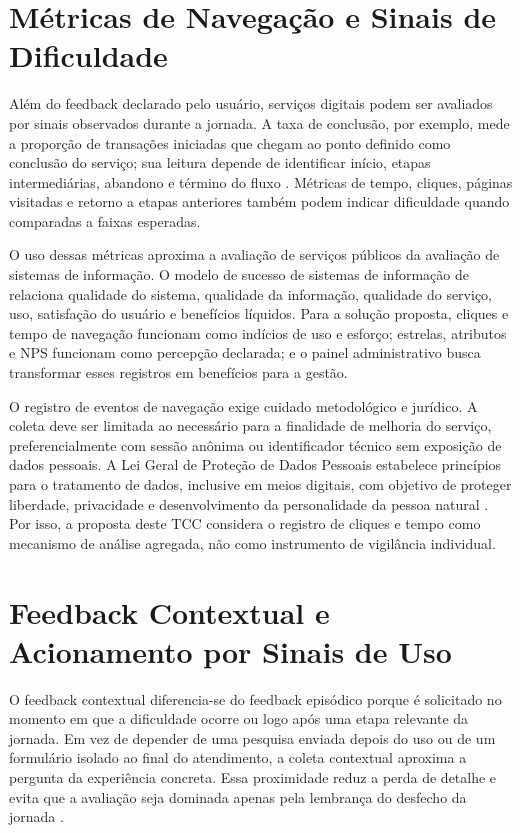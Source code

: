 \section{Métricas de Navegação e Sinais de Dificuldade}

Além do feedback declarado pelo usuário, serviços digitais podem ser avaliados
por sinais observados durante a jornada. A taxa de conclusão, por exemplo, mede a
proporção de transações iniciadas que chegam ao ponto definido como conclusão do
serviço; sua leitura depende de identificar início, etapas intermediárias,
abandono e término do fluxo \cite{govuk2021completionRate}. Métricas de tempo,
cliques, páginas visitadas e retorno a etapas anteriores também podem indicar
dificuldade quando comparadas a faixas esperadas.

O uso dessas métricas aproxima a avaliação de serviços públicos da avaliação de
sistemas de informação. O modelo de sucesso de sistemas de informação de
 relaciona qualidade do sistema, qualidade da
informação, qualidade do serviço, uso, satisfação do usuário e benefícios
líquidos. Para a solução proposta, cliques e tempo de navegação funcionam como
indícios de uso e esforço; estrelas, atributos e NPS funcionam como percepção
declarada; e o painel administrativo busca transformar esses registros em
benefícios para a gestão.

O registro de eventos de navegação exige cuidado metodológico e jurídico. A
coleta deve ser limitada ao necessário para a finalidade de melhoria do serviço,
preferencialmente com sessão anônima ou identificador técnico sem exposição de
dados pessoais. A Lei Geral de Proteção de Dados Pessoais estabelece princípios
para o tratamento de dados, inclusive em meios digitais, com objetivo de proteger
liberdade, privacidade e desenvolvimento da personalidade da pessoa natural
\cite{brasil2018lgpd}. Por isso, a proposta deste TCC considera o registro de
cliques e tempo como mecanismo de análise agregada, não como instrumento de
vigilância individual.

\section{Feedback Contextual e Acionamento por Sinais de Uso}
\label{sec:feedback-contextual}

O feedback contextual diferencia-se do feedback episódico porque é solicitado no
momento em que a dificuldade ocorre ou logo após uma etapa relevante da jornada.
Em vez de depender de uma pesquisa enviada depois do uso ou de um formulário
isolado ao final do atendimento, a coleta contextual aproxima a pergunta da
experiência concreta. Essa proximidade reduz a perda de detalhe e evita que a
avaliação seja dominada apenas pela lembrança do desfecho da jornada
\cite{kahneman1993peakEnd}.

